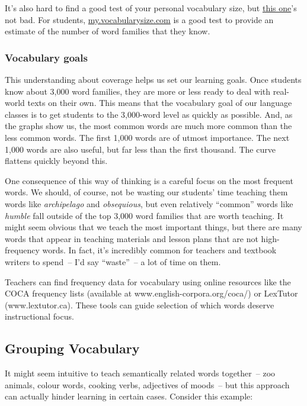 It's also hard to find a good test of your personal vocabulary size, but \href{https://www.vocabularytester.com/vocabulary-test}{this one}'s not bad. For students, \href{https://my.vocabularysize.com/}{my.vocabularysize.com} is a good test to provide an estimate of the number of word families that they know.

\subsubsection*{Vocabulary goals}

This understanding about coverage helps us set our learning goals. Once students know about 3,000 word families, they are more or less ready to deal with real-world texts on their own. This means that the vocabulary goal of our language classes is to get students to the 3,000-word level as quickly as possible. And, as the graphs show us, the most common words are much more common than the less common words. The first 1,000 words are of utmost importance. The next 1,000 words are also useful, but far less than the first thousand. The curve flattens quickly beyond this.

One consequence of this way of thinking is a careful focus on the most frequent words. We should, of course, not be wasting our students' time teaching them words like \textit{archipelago} and \textit{obsequious}, but even relatively ``common'' words like \textit{humble} fall outside of the top 3,000 word families that are worth teaching. It might seem obvious that we teach the most important things, but there are many words that appear in teaching materials and lesson plans that are not high-frequency words. In fact, it's incredibly common for teachers and textbook writers to spend~-- I'd say ``waste''~-- a lot of time on them.

Teachers can find frequency data for vocabulary using online resources like the COCA frequency lists (available at www.english-corpora.org/coca/) or LexTutor (www.lextutor.ca). These tools can guide selection of which words deserve instructional focus.

\subsection{Grouping Vocabulary}

It might seem intuitive to teach semantically related words together~-- zoo animals, colour words, cooking verbs, adjectives of moods~-- but this approach can actually hinder learning in certain cases. Consider this example: 

